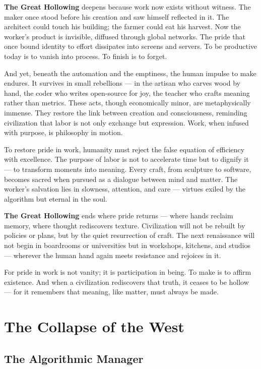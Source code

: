 \documentclass[11pt,twoside]{book}
\begin{document}
\textbf{The Great Hollowing} deepens because work now exists without witness.  
The maker once stood before his creation and saw himself reflected in it.  
The architect could touch his building; the farmer could eat his harvest.  
Now the worker’s product is invisible, diffused through global networks.  
The pride that once bound identity to effort dissipates into screens and servers.  
To be productive today is to vanish into process.  
To finish is to forget.

And yet, beneath the automation and the emptiness, the human impulse to make endures.  
It survives in small rebellions — in the artisan who carves wood by hand, the coder who writes open-source for joy, the teacher who crafts meaning rather than metrics.  
These acts, though economically minor, are metaphysically immense.  
They restore the link between creation and consciousness, reminding civilization that labor is not only exchange but expression.  
Work, when infused with purpose, is philosophy in motion.

To restore pride in work, humanity must reject the false equation of efficiency with excellence.  
The purpose of labor is not to accelerate time but to dignify it — to transform moments into meaning.  
Every craft, from sculpture to software, becomes sacred when pursued as a dialogue between mind and matter.  
The worker’s salvation lies in slowness, attention, and care — virtues exiled by the algorithm but eternal in the soul.

\textbf{The Great Hollowing} ends where pride returns — where hands reclaim memory, where thought rediscovers texture.  
Civilization will not be rebuilt by policies or plans, but by the quiet resurrection of craft.  
The next renaissance will not begin in boardrooms or universities but in workshops, kitchens, and studios — wherever the human hand again meets resistance and rejoices in it.

For pride in work is not vanity; it is participation in being.  
To make is to affirm existence.  
And when a civilization rediscovers that truth, it ceases to be hollow — for it remembers that meaning, like matter, must always be made.

\part{The Collapse of the West}
% 
\chapter{The Algorithmic Manager}
\label{ch:33}
\end{document}
